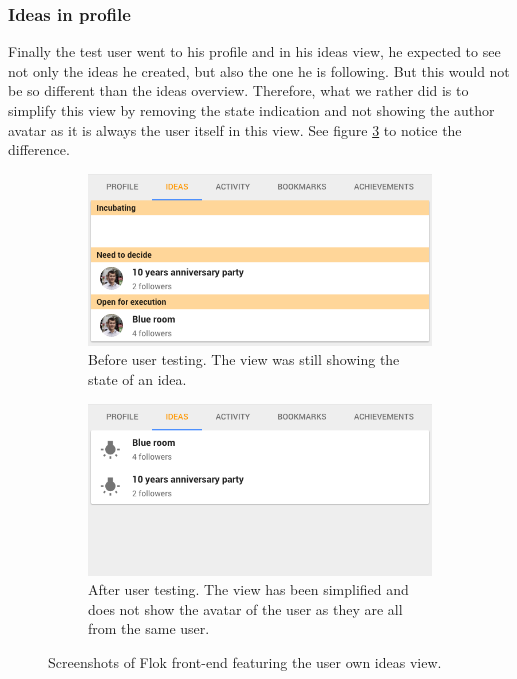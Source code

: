 \documentclass[a4paper,12pt,twoside]{article}
\begin{document}
\subsubsection*{Ideas in profile}
Finally the test user went to his profile and in his ideas view, he expected to see not only the ideas he created, but also the one he is following.
But this would not be so different than the ideas overview.
Therefore, what we rather did is to simplify this view by removing the state indication and not showing the author avatar as it is always the user itself in this view.
See figure \ref{fig.tests.personIdeas} to notice the difference.

\begin{figure}[!htb]
    \begin{subfigure}[t]{.495\textwidth}
        \includegraphics[width=\textwidth]{images/user_tests/personIdeas_before.png}
        \caption{Before user testing. The view was still showing the state of an idea.}
        \label{fig.tests.personIdeas.before}
    \end{subfigure}
    \hfill
    \begin{subfigure}[t]{.495\textwidth}
        \includegraphics[width=\textwidth]{images/user_tests/personIdeas_after.png}
        \caption{After user testing. The view has been simplified and does not show the avatar of the user as they are all from the same user.}
        \label{fig.tests.personIdeas.after}
    \end{subfigure}
    \caption{Screenshots of Flok front-end featuring the user own ideas view.}
    \label{fig.tests.personIdeas}
\end{figure}
\end{document}
